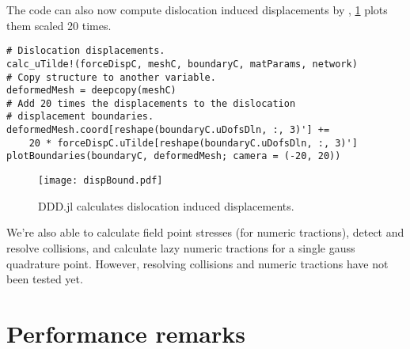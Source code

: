 The code can also now compute dislocation induced displacements by \citet{bromage2018calculating}, \cref{f:dlnDisp} plots them scaled 20 times.
\begin{verbatim}
# Dislocation displacements.
calc_uTilde!(forceDispC, meshC, boundaryC, matParams, network)
# Copy structure to another variable.
deformedMesh = deepcopy(meshC)
# Add 20 times the displacements to the dislocation 
# displacement boundaries.
deformedMesh.coord[reshape(boundaryC.uDofsDln, :, 3)'] += 
    20 * forceDispC.uTilde[reshape(boundaryC.uDofsDln, :, 3)']
plotBoundaries(boundaryC, deformedMesh; camera = (-20, 20))
\end{verbatim}
\begin{figure}
    \centering
    \texttt{[image: dispBound.pdf]}
    \caption{DDD.jl calculates dislocation induced displacements.}
    \label{f:dlnDisp}
\end{figure}
We're also able to calculate field point stresses (for numeric tractions), detect and resolve collisions, and calculate lazy numeric tractions for a single gauss quadrature point. However, resolving collisions and numeric tractions have not been tested yet.

\section{Performance remarks}

